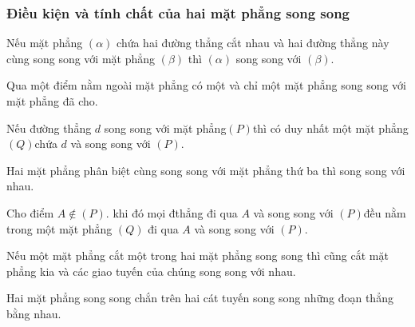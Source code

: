 \subsubsection{Điều kiện và tính chất của hai mặt phẳng song song}
\begin{tc}
	Nếu mặt phẳng $\left( \alpha  \right)$ chứa hai đường thẳng cắt nhau và hai đường thẳng này cùng song song với mặt phẳng $\left( \beta  \right)$ thì $\left( \alpha  \right)$ song song với $\left( \beta  \right)$.
\end{tc}
\begin{tc}
	Qua một điểm nằm ngoài mặt phẳng có một và chỉ một mặt phẳng song song với mặt phẳng đã cho.
\end{tc}
\begin{tc}
	Nếu đường thẳng $d$ song song với mặt phẳng$\left( P \right)$thì có duy nhất một mặt phẳng $\left( Q \right)$chứa $d$ và song song với $\left( P \right)$.
\end{tc}
\begin{tc}
	Hai mặt phẳng phân biệt cùng song song với mặt phẳng thứ ba thì song song với nhau.
\end{tc}
\begin{tc}
	Cho điểm $A\notin \left( P \right)$. khi đó mọi đthẳng đi qua $A$ và song song với $\left( P \right)$đều nằm trong một mặt phẳng $\left( Q \right)$ đi qua $A$ và song song với $\left( P \right)$.
\end{tc}
\begin{tc}
	Nếu một mặt phẳng cắt một trong hai mặt phẳng song song thì cũng cắt mặt phẳng kia và các giao tuyến của chúng song song với nhau.
\end{tc}
\begin{hq}
	Hai mặt phẳng song song chắn trên hai cát tuyến song song những đoạn thẳng bằng nhau.
\end{hq}
